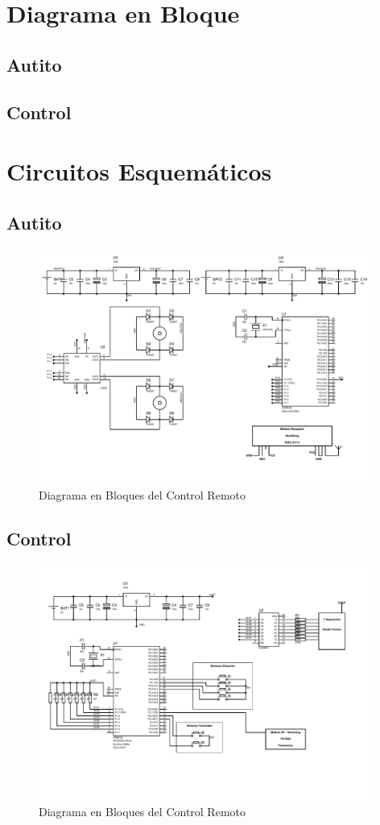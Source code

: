 \documentclass[a4paper,10pt]{article}
\begin{document}
		
	\section{Diagrama en Bloque}
		\subsection{Autito}
		\subsection{Control}

	\section{Circuitos Esquemáticos}
		\subsection{Autito}
			\begin{figure}[!htb]
				\centering
				\includegraphics[width=11cm]{Imagenes/EsquematicoAuto.PDF}
				\caption{Diagrama en Bloques del Control Remoto} \label{img003}
			\end{figure}
		
		\subsection{Control}
			\begin{figure}[!htb]
				\centering
				\includegraphics[width=11cm]{Imagenes/EsquematicoControl.PDF}
				\caption{Diagrama en Bloques del Control Remoto} \label{img003}
			\end{figure}
	
\end{document}
